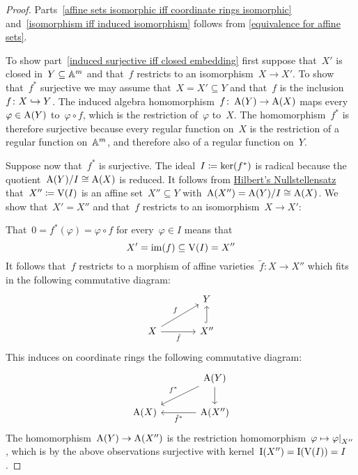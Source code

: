 \begin{proof}
  Parts~\ref*{affine sets isomorphic iff coordinate rings isomorphic} and~\ref*{isomorphism iff induced isomorphism} follows from \cref{equivalence for affine sets}.
  
  To show part~\ref*{induced surjective iff closed embedding} first suppose that~$X'$ is closed in~$Y \subseteq \mathbb{A}^m$ and that~$f$ restricts to an isomorphism~$X \to X'$.
  To show that~$f^*$ surjective we may assume that~$X = X' \subseteq Y$ and that~$f$ is the inclusion~$f \colon X \hookrightarrow Y$.
  The induced algebra homomorphism~$f \colon \operatorname{A}(Y) \to \operatorname{A}(X)$ maps every~$\varphi \in \operatorname{A}(Y)$ to~$\varphi \circ f$, which is the restriction of~$\varphi$ to~$X$.
  The homomorphism~$f^*$ is therefore surjective because every regular function on~$X$ is the restriction of a regular function on~$\mathbb{A}^m$, and therefore also of a regular function on~$Y$.
  
  Suppose now that~$f^*$ is surjective.
  The ideal~$I \coloneqq \ker(f^*)$ is radical because the quotient~$\operatorname{A}(Y)/I \cong \operatorname{A}(X)$ is reduced.
  It follows from \hyperref[nullstellensatz 3]{Hilbert’s Nullstellensatz} that~$X'' \coloneqq \operatorname{V}(I)$ is an affine set~$X'' \subseteq Y$ with~$\operatorname{A}(X'') = \operatorname{A}(Y)/I \cong \operatorname{A}(X)$.
  We show that~$X' = X''$ and that~$f$ restricts to an isomorphism~$X \to X'$:
  
  That~$0 = f^*(\varphi) = \varphi \circ f$ for every~$\varphi \in I$ means that
  \[
              X'
    =         \operatorname{im}(f)
    \subseteq \operatorname{V}(I)
    =         X''
  \]
  It follows that~$f$ restricts to a morphism of affine varieties~$\tilde{f} \colon X \to X''$ which fits in the following commutative diagram:
  \[
    \begin{tikzcd}[column sep = large]
        {}
      & Y
      \\
        X
        \arrow{ru}[above left]{f}
        \arrow{r}[below]{\tilde{f}}
      & X''
        \arrow[hook]{u}
    \end{tikzcd}
  \]
  This induces on coordinate rings the following commutative diagram:
  \[
    \begin{tikzcd}[column sep = large]
        {}
      & \coord(Y)
        \arrow{dl}[above left]{f^*}
        \arrow{d}
      \\
        \coord(X)
      & \coord(X'')
        \arrow{l}[below]{\tilde{f}^*}
    \end{tikzcd}
  \]
  The homomorphism~$\operatorname{A}(Y) \to \operatorname{A}(X'')$ is the restriction homomorphism~$\varphi \mapsto \restrict{\varphi}{X''}$, which is by the above observations surjective with kernel~$\operatorname{I}(X'') = \operatorname{I}(\operatorname{V}(I)) = I$.
  

\end{proof}
